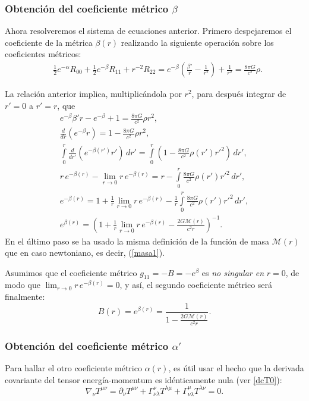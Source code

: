 \subsubsection{Obtención del coeficiente métrico \texorpdfstring{$\beta$}{B}}
Ahora resolveremos el sistema de ecuaciones anterior. Primero despejaremos el coeficiente de la métrica $\beta(r)$ realizando la siguiente operación sobre los coeficientes métricos:
\begin{align}
 &\frac{1}{2}e^{-\alpha}R_{00}+\frac{1}{2}e^{-\beta}R_{11}+r^{-2}R_{22}=e^{-\beta}\left(\frac{\beta'}{r}-\frac{1}{r^2}\right)+\frac{1}{r^2}=\frac{8\pi G}{c^2}\rho.
\end{align}

La relación anterior implica, multiplicándola por $r^2$, para después integrar de $r'=0$ a $r'=r$, que
\begin{gather}
e^{-\beta}\beta' r-e^{-\beta}+1=\frac{8\pi G}{c^2}\rho r^2,\\
 \frac{d}{dr}\left( e^{-\beta}r\right) =1-\frac{8\pi G}{c^2}\rho r^2,\\
 \int\limits_{0}^r\frac{d}{dr'}\left( e^{-\beta(r')}r'\right)\,dr' =\int\limits_{0}^r \left(1-\frac{8\pi G}{c^2}\rho(r') r'^2\right)\,dr',\\
 r\,e^{-\beta(r)}-\lim_{r\to0}r\,e^{-\beta(r)}=r-\int\limits_{0}^r \frac{8\pi G}{c^2}\rho(r') r'^2\,dr',\\
e^{-\beta(r)}=1+\frac{1}{r}\lim_{r\to0}r\,e^{-\beta(r)}-\frac{1}{r}\int\limits_{0}^r \frac{8\pi G}{c^2}\rho(r') r'^2\,dr',\\
e^{\beta(r)}=\left(1+\frac{1}{r}\lim_{r\to0}r\,e^{-\beta(r)}-\frac{2G\mathcal{M}(r)}{c^2r}\right)^{-1}.
\end{gather}
En el último paso se ha usado la misma definición de la función de masa $\mathcal{M}(r)$ que en caso newtoniano, es decir,  (\ref{masa1}).

Asumimos que el coeficiente métrico $g_{11}=-B=-e^{\beta}$ es \textit{no singular en} $r=0$, de modo que $\lim_{r\to0}r\,e^{-\beta(r)}=0$, y así, el segundo coeficiente métrico será finalmente:
\begin{equation}\label{beta}
\boxed{B(r)=e^{\beta(r)}=\dfrac{1}{1-\frac{2G\mathcal{M}(r)}{c^2r}}.}
\end{equation}

\subsubsection{Obtención del coeficiente métrico \texorpdfstring{$\alpha'$}{á}}
Para hallar el otro coeficiente métrico $\alpha(r)$, es útil usar el hecho que la derivada covariante del tensor energía-momentum es idénticamente nula (ver \eqref{dcT0}):
\begin{equation}\label{cons}
 \nabla_{\nu}T^{\mu\nu}=\partial_{\nu}T^{\mu\nu}+\Gamma^{\nu}_{\nu\lambda}T^{\lambda\mu}+\Gamma^{\mu}_{\nu\lambda}T^{\lambda\nu}=0.
\end{equation}

